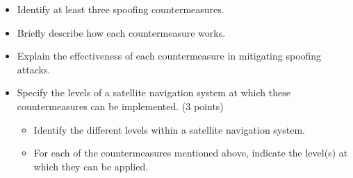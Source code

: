 \begin{itemize}
    \item Identify at least three spoofing countermeasures.
    \item Briefly describe how each countermeasure works.
    \item Explain the effectiveness of each countermeasure in mitigating spoofing attacks.
    \item Specify the levels of a satellite navigation system at which these countermeasures can be implemented. (3 points)
          \begin{itemize}
              \item Identify the different levels within a satellite navigation system.
              \item For each of the countermeasures mentioned above, indicate the level(s) at which they can be applied.
          \end{itemize}
\end{itemize}


